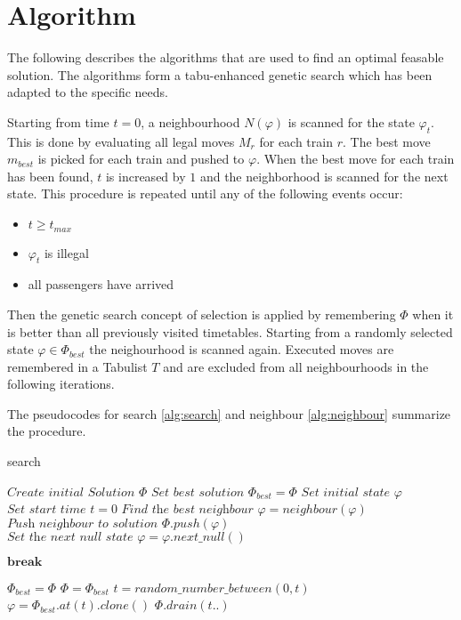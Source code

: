 \documentclass[a4paper,12pt,parskip]{article}
\begin{document}
\section{Algorithm}

The following describes the algorithms that are used to find an optimal feasable
solution. The algorithms form a tabu-enhanced genetic search which has been adapted 
to the specific needs. 

Starting from time $t=0$, a neighbourhood $N(\varphi)$ is scanned for the state 
$\varphi_t$. This is done by evaluating all legal moves $M_r$ for each train $r$. 
The best move $m_{best}$ is picked for each train and pushed to $\varphi$. When 
the best move for each train has been found, $t$ is increased by $1$ and the 
neighborhood is scanned for the next state. This procedure is repeated until any 
of the following events occur:

\begin{itemize}
    \item $t \ge t_{max}$
    \item $\varphi_t$ is illegal
    \item all passengers have arrived
\end{itemize}

Then the genetic search concept of selection is applied by remembering $\Phi$ 
when it is better than all previously visited timetables. Starting from a 
randomly selected state $\varphi \in \Phi_{best}$ the neighourhood is scanned 
again. Executed moves are remembered in a Tabulist $T$ and are excluded from all 
neighbourhoods in the following iterations.

The pseudocodes for search \ref{alg:search} and neighbour \ref{alg:neighbour}
summarize the procedure.

\begin{algorithm}
\caption{search}\label{alg:search}
\begin{algorithmic}
    \State $\textit{Create initial Solution } \Phi$
    \State $\textit{Set best solution } \Phi_{best} = \Phi$
    \State $\textit{Set initial state } \varphi$
    \State $\textit{Set start time } t=0$
            \State $\textit{Find the best neighbour } \varphi = neighbour(\varphi)$
            \State $\textit{Push neighbour to solution } \Phi.push(\varphi)$
            \State $\textit{Set the next null state } \varphi = \varphi.next\_null()$

                \State $\textbf{break}$
            \EndIf
        \EndWhile

            \State $\Phi_{best} = \Phi$
        \Else
            \State $\Phi = \Phi_{best}$
        \EndIf  
        \State $t = random\_number\_between(0, t)$
        \State $\varphi = \Phi_{best}.at(t).clone()$
        \State $\Phi.drain(t..)$
    \EndWhile
\end{algorithmic}
\end{algorithm}
\end{document}
